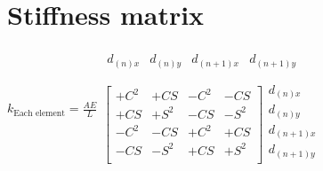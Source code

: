 \documentclass{article}
\begin{document}
\section{Stiffness matrix}
    \begin{math}
    k_{\text{Each element}}=\frac{AE}{L}
        \begin {matrix}
            \begin {matrix}
            d_{(n)x} & d_{(n)y} & d_{(n+1)x} & d_{(n+1)y}\\
            \end{matrix}\\
            \begin{bmatrix}
            +C^2&+CS &-C^2&-CS \\
            +CS &+S^2&-CS &-S^2\\
            -C^2&-CS &+C^2&+CS \\
           -CS &-S^2&+CS &+S^2\\
            \end{bmatrix}
            \begin{matrix}
            d_{(n)x}\\
            d_{(n)y}\\
            d_{(n+1)x}\\
            d_{(n+1)y}\\
            \end{matrix}
        \end{matrix}
    \end{math}
\end{document}
